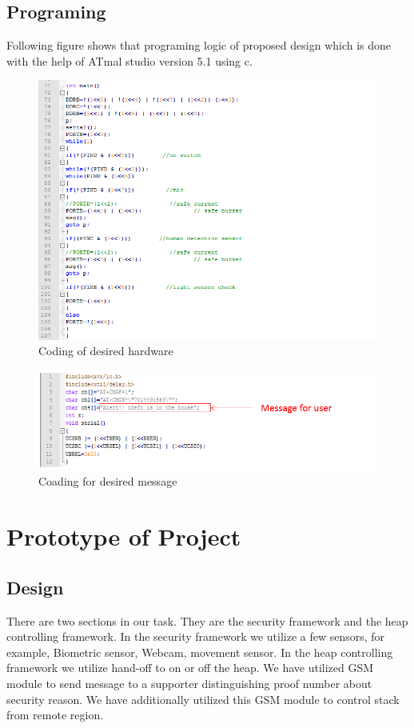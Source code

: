 \documentclass[twoside,a4paper,16pt]{book}
\begin{document}
{{\section{Programing}
Following figure shows that programing logic of proposed design which is done with the help of ATmal studio version 5.1 using c.
\newpage
\begin{figure}[ht!]
	\begin{left}
		\includegraphics[width=15.0cm]{p5.png}
		\caption{Coding of desired hardware }
	\end{left}
\end{figure}
\begin{figure}[ht!]
	\begin{left}
		\includegraphics[width=15.0cm]{p7.png}
		\caption{Coading for desired message }
	\end{left}
\end{figure}
\chapter{Prototype of Project}
\section{Design}
There are two sections in our task. They are the security framework and the heap controlling framework. In the security framework we utilize a few sensors, for example, Biometric sensor, Webcam, movement sensor. In the heap controlling framework we utilize hand-off to on or off the heap. We have utilized GSM module to send message to a supporter distinguishing proof number about security reason. We have additionally utilized this GSM module to control stack from remote region.
}}
\end{document}

